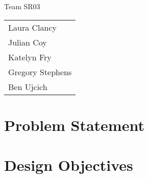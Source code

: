 \documentclass[11pt]{report}
\begin{document}
\begin{spacing}{1.5}

\thispagestyle{empty}

\vspace*{72pt}
{
\huge
\begin{center}
    \reporttitle
\end{center}
}
\vspace{72pt}

{
\huge
\begin{center}
    Team SR03
\end{center}
}

{
\Large 
\begin{center}
    \begin{tabular}{l}
      Laura Clancy \\
      Julian Coy \\
      Katelyn Fry \\
      Gregory Stephens \\
      Ben Ujcich
    \end{tabular}
\end{center}
}

\clearpage
\setcounter{page}{1}





\section*{Problem Statement} %


\section*{Design Objectives} %


\end{spacing}
\end{document}
